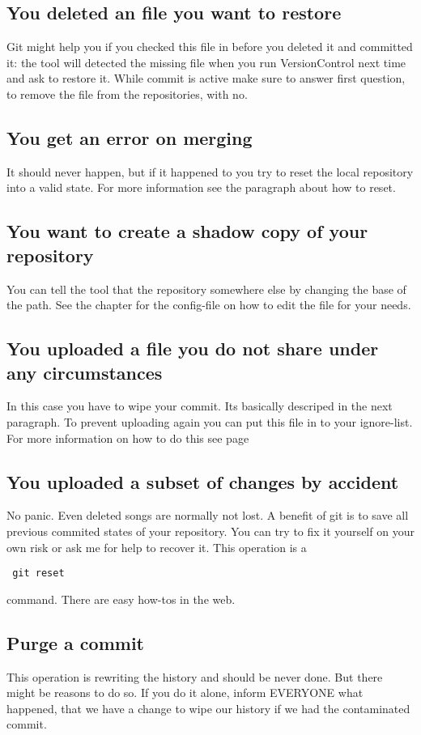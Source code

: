\documentclass[10pt,a4paper,oneside]{article}
\begin{document}
\subsection{You deleted an file you want to restore}
Git might help you if you checked this file in before you deleted it and committed it: the tool will detected the missing file when you run VersionControl next time and ask to restore it. While commit is active make sure to answer first question, to remove the file from the repositories, with no. 

\subsection{You get an error on merging}
\label{mergeConflict}
It should never happen, but if it happened to you try to reset the local repository into a valid state. For more information see the paragraph about how to reset\pageref{reset}.

\subsection{You want to create a shadow copy of your repository}
\label{changeLocation}
You can tell the tool that the repository somewhere else by changing the base of the path. See the chapter for the config-file\pageref{configFile} on how to edit the file for your needs.

\subsection{You uploaded a file you do not share under any circumstances}
In this case you have to wipe your commit. Its basically descriped in the next paragraph. To prevent uploading again you can put this file in to your ignore-list. For more information on how to do this see page\pageref{Ignore}

\subsection{You uploaded a subset of changes by accident}
\label{Undo commit}
No panic. Even deleted songs are normally not lost. A benefit of git is to save all previous commited states of your repository. You can try to fix it yourself on your own risk or ask me for help to recover it. This operation is a \begin{verbatim} git reset \end{verbatim} command. There are easy how-tos in the web.

\subsection{Purge a commit}
\label{Purge commit}
This operation is rewriting the history and should be never done. But there might be reasons to do so. If you do it alone, inform  EVERYONE what happened, that we have a change to wipe our history if we had the contaminated commit.
\end{document}

